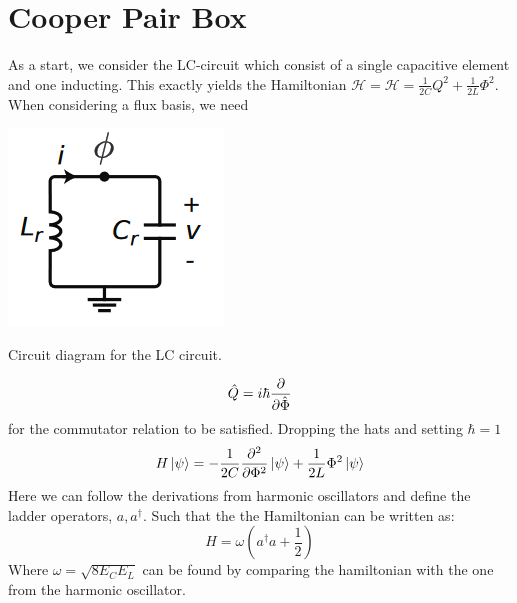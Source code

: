 \section{Cooper Pair Box}
As a start, we consider the LC-circuit which consist of a single capacitive element and one inducting. This exactly yields the Hamiltonian $\mathcal{H} = \mathcal{H} = \frac{1}{2C} Q^2 + \frac{1}{2L} \Phi^2$. When considering a flux basis, we need 
\begin{marginfigure}[1 cm]
    \includegraphics[width = \linewidth]{tex/fig_for_text/LC_circuit.png}
    \caption{Circuit diagram for the LC circuit.}
\end{marginfigure}
\begin{equation}
    \hat{Q} = i\hbar \frac{\partial }{\partial \hat{\Phi}}
\end{equation}
for the commutator relation to be satisfied. Dropping the hats and setting $\hbar = 1$
\begin{equation}
    H \ket{\psi} = - \frac{1}{2C} \frac{\partial^2 }{\partial \Phi^2}\ket{\psi} + \frac{1}{2L} \Phi^2 \ket{\psi}
\end{equation}
Here we can follow the derivations from harmonic oscillators and define the ladder operators, $a, a^\dagger$. Such that the the Hamiltonian can be written as:
\begin{equation}
    H = \omega (a^\dagger a + \frac12)
\end{equation}
Where $\omega = \sqrt{8 E_C E_L}$ can be found by comparing the hamiltonian with the one from the harmonic oscillator.

